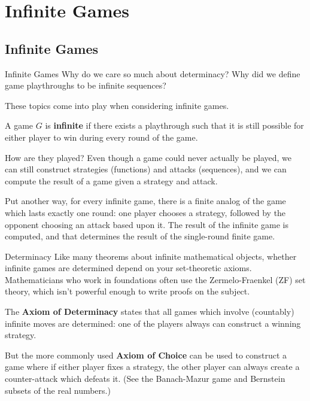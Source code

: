 \documentclass{beamer}
\theoremstyle{theorem}
\theoremstyle{definition}
\newcommand{\<}{\langle}
\renewcommand{\>}{\rangle}
\newcommand{\vpause}{\pause\vspace{1em}}
\newcommand{\term}[1]{\textbf{#1}}
\begin{document}
\section{Infinite Games}

\subsection{Infinite Games}

\begin{frame}{Infinite Games}
  Why do we care so much about determinacy? Why did we define game playthroughs
  to be infinite sequences?

  \vpause

  These topics come into play when considering infinite games.

  \vpause

  \begin{definition}
    A game $G$ is \term{infinite} if there exists a playthrough such that it
    is still possible for either player to win during every round of the game.
  \end{definition}
\end{frame}

\begin{frame}{How are they played?}
  Even though a game could never actually be played, we can still construct
  strategies (functions) and attacks (sequences), and we can compute the
  result of a game given a strategy and attack.

  \vpause

  Put another way, for every infinite game, there is a finite analog of the
  game which lasts exactly one round: one player chooses a strategy, followed
  by the opponent choosing an attack based upon it. The result of the infinite
  game is computed, and that determines the result of the single-round finite
  game.
\end{frame}

\begin{frame}{Determinacy}
  Like many theorems about infinite mathematical objects, whether infinite
  games are determined depend on your set-theoretic axioms. Mathematicians who
  work in foundations often use the Zermelo-Fraenkel (ZF) set theory, which
  isn't powerful enough to write proofs on the subject.

  \vpause

  The \term{Axiom of Determinacy} states that all games which
  involve (countably) infinite moves are determined: one of the players always
  can construct a winning strategy.

  \vpause

  But the more commonly used \term{Axiom of Choice} can be used to construct
  a game where if either player fixes a strategy, the other player can always
  create a counter-attack which defeats it. (See the Banach-Mazur game and
  Bernstein subsets of the real numbers.)
\end{frame}
\end{document}
